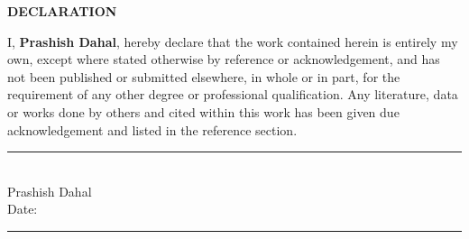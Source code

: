 \newpage
\begin{center}
{\Large \textbf{DECLARATION}}\\[1cm]
\end{center}

\noindent
I, \textbf{Prashish Dahal}, hereby declare that the work contained herein is
entirely my own, except where stated otherwise by reference or
acknowledgement, and has not been published or submitted elsewhere,
in whole or in part, for the requirement of any other degree or
professional qualification. Any literature, data or works done by
others and cited within this work has been given due acknowledgement
and listed in the reference section.

\vspace{3cm}
\begin{flushleft}
\rule{6cm}{0.4pt}\\
Prashish Dahal\\[0.5cm]
Date: \rule{4cm}{0.4pt}
\end{flushleft}